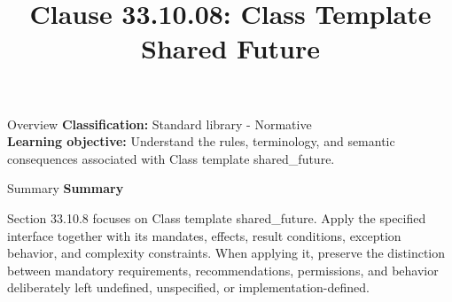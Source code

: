 \documentclass[10pt,letterpaper]{article}
\title{Clause 33.10.08: Class Template Shared Future}
\author{}
\date{}
\begin{document}
\maketitle
\begin{CornellOverviewBox}{Overview}
\textbf{Classification:} Standard library - Normative\\[2pt]
\textbf{Learning objective:} Understand the rules, terminology, and semantic consequences associated with Class template shared\_future.
\end{CornellOverviewBox}\begin{CornellSummaryBox}{Summary}
{\sffamily\bfseries\color{Accent} Summary}\par\vspace{3pt}Section 33.10.8 focuses on Class template shared\_future. Apply the specified interface together with its mandates, effects, result conditions, exception behavior, and complexity constraints. When applying it, preserve the distinction between mandatory requirements, recommendations, permissions, and behavior deliberately left undefined, unspecified, or implementation-defined.
\end{CornellSummaryBox}
\end{document}
